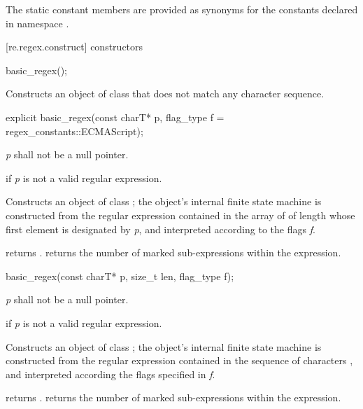 \pnum
{}%
The static constant members are provided as synonyms for the constants
declared in namespace .

[re.regex.construct]{ constructors}

%
\begin{itemdecl}
basic_regex();
\end{itemdecl}

\begin{itemdescr}
\pnum
\effects  Constructs an object of class  that
does not match any character sequence.
\end{itemdescr}

%
\begin{itemdecl}
explicit basic_regex(const charT* p, flag_type f = regex_constants::ECMAScript);
\end{itemdecl}

\begin{itemdescr}
\pnum
\requires  \textit{p} shall not be a null pointer. 

\pnum
\throws  {} if \textit{p} is not a valid regular expression. 

\pnum
\effects  Constructs an object of class ; the object's
internal finite state machine is constructed from the regular
expression contained in the array of  of length
 whose first element is
designated by \textit{p}, and interpreted according to the flags \textit{f}.

\pnum\postconditions
{} returns .  
 returns the number of marked sub-expressions
within the expression.
\end{itemdescr}

%
\begin{itemdecl}
basic_regex(const charT* p, size_t len, flag_type f);
\end{itemdecl}

\begin{itemdescr}
\pnum
\requires  \textit{p} shall not be a null pointer.

\pnum
\throws  {} if \textit{p} is not a valid regular expression. 

\pnum
\effects  Constructs an object of class ; the object's
internal finite state machine is constructed from the regular
expression contained in the sequence of characters , and
interpreted according the flags specified in \textit{f}. 

\pnum\postconditions
{} returns .  
 returns the number of marked sub-expressions
within the expression.
\end{itemdescr}


